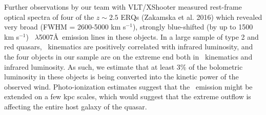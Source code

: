 \smallskip
\smallskip
\noindent
Further observations by our team with VLT/XShooter measured rest-frame
optical spectra of four of the $z\sim 2.5$ ERQs (Zakamska et al. 2016)
which revealed very broad (FWHM = 2600-5000 km s$^{-1}$), strongly
blue-shifted (by up to 1500 km s$^{-1}$) \oiii\ $\lambda$5007\AA\
emission lines in these objects. In a large sample of type 2 and red
quasars, \oiii\ kinematics are positively correlated with infrared
luminosity, and the four objects in our sample are on the extreme end
both in \oiii\ kinematics and infrared luminosity.  As such, we
estimate that at least 3\% of the bolometric luminosity in these
objects is being converted into the kinetic power of the observed
wind. Photo-ionization estimates suggest that the \oiii\ emission
might be extended on a few kpc scales, which would suggest that the
extreme outflow is affecting the entire host galaxy of the quasar.


